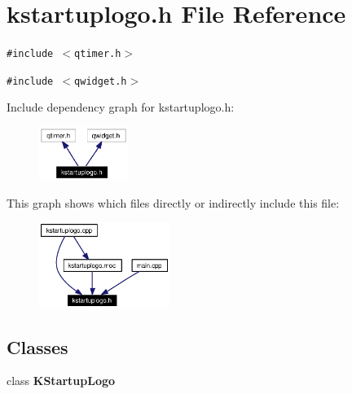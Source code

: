 \section{kstartuplogo.h File Reference}
\label{kstartuplogo_8h}


{\tt \#include $<$qtimer.h$>$}\par
{\tt \#include $<$qwidget.h$>$}\par


Include dependency graph for kstartuplogo.h:\begin{figure}[H]
\begin{center}
\leavevmode
\includegraphics[width=82pt]{kstartuplogo_8h__incl}
\end{center}
\end{figure}


This graph shows which files directly or indirectly include this file:\begin{figure}[H]
\begin{center}
\leavevmode
\includegraphics[width=120pt]{kstartuplogo_8h__dep__incl}
\end{center}
\end{figure}
\subsection*{Classes}
\begin{CompactItemize}
\item 
class {\bf KStartup\-Logo}
\end{CompactItemize}
